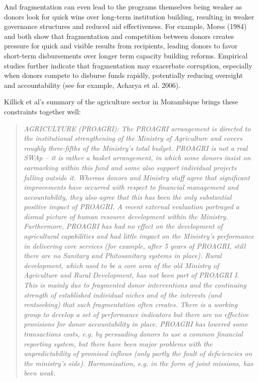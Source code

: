\documentclass[11pt]{article}
\begin{document}
And fragmentation can even lead to the programs themselves being weaker as donors look for quick wins over long-term institution building, resulting in weaker governance structures and reduced aid effectiveness.  For example, Morss (1984) and \cite{knack_donor_2007} both show that fragmentation and competition between donors creates pressure for quick and visible results from recipients, leading donors to favor short-term disbursements over longer term capacity building reforms. Empirical studies further indicate that fragmentation may exacerbate corruption, especially when donors compete to disburse funds rapidly, potentially reducing oversight and accountability (see for example, Acharya et al. 2006).

Killick et al’s summary of the agriculture sector in Mozambique brings these constraints together well:
\begin{quote} \textit{AGRICULTURE (PROAGRI):  The PROAGRI arrangement is directed to the institutional strengthening of the Ministry of Agriculture and covers roughly three-fifths of the Ministry’s total budget.  PROAGRI is not a real SWAp – it is rather a basket arrangement, in which some donors insist on earmarking within this fund and some also support individual projects falling outside it.  Whereas donors and Ministry staff agree that significant improvements have occurred with respect to financial management and accountability, they also agree that this has been the only substantial positive impact of PROAGRI.  A recent external evaluation portrayed a dismal picture of human resource development within the Ministry.  Furthermore, PROAGRI has had no effect on the development of agricultural capabilities and had little impact on the Ministry’s performance in delivering core services (for example, after 5 years of PROAGRI, still there are no Sanitary and Phitosanitary systems in place).  Rural development, which used to be a core area of the old Ministry of Agriculture and Rural Development, has not been part of PROAGRI I.  This is mainly due to fragmented donor interventions and the continuing strength of established individual niches and of the interests (and rentseeking) that such fragmentation often creates.  There is a working group to develop a set of performance indicators but there are no effective provisions for donor accountability in place.  PROAGRI has lowered some transactions costs, e.g.  by persuading donors to use a common financial reporting system, but there have been major problems with the unpredictability of promised inflows (only partly the fault of deficiencies on the ministry’s side).  Harmonisation, e.g.  in the form of joint missions, has been weak.} 
\end{quote}
\end{document}
